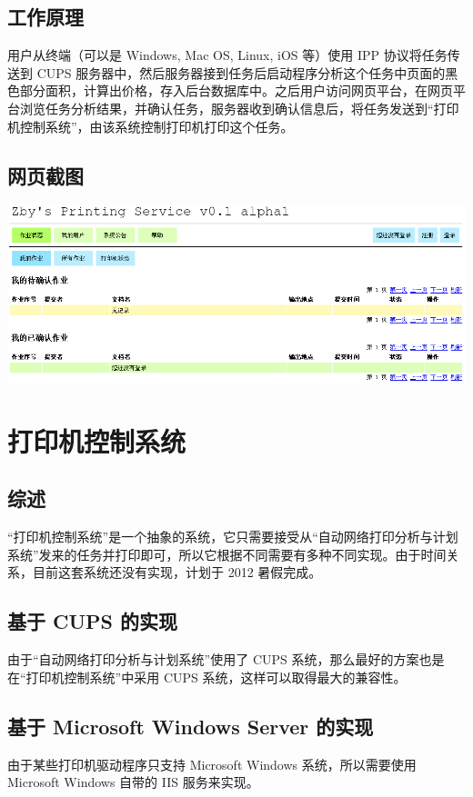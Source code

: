 \documentclass{article}
\begin{document}
\begin{CJK}{UTF8}{gbsn}
	\subsection{工作原理}
		用户从终端（可以是 Windows, Mac OS, Linux, iOS 等）使用 IPP 协议将任务传送到 CUPS 服务器中，然后服务器接到任务后启动程序分析这个任务中页面的黑色部分面积，计算出价格，存入后台数据库中。之后用户访问网页平台，在网页平台浏览任务分析结果，并确认任务，服务器收到确认信息后，将任务发送到“打印机控制系统”，由该系统控制打印机打印这个任务。

	\subsection{网页截图}
		\includegraphics[width=\textwidth]{screenshot.png}
\newpage

\section{打印机控制系统}
	\subsection{综述}
		“打印机控制系统”是一个抽象的系统，它只需要接受从“自动网络打印分析与计划系统”发来的任务并打印即可，所以它根据不同需要有多种不同实现。由于时间关系，目前这套系统还没有实现，计划于 2012 暑假完成。
	\subsection{基于 CUPS 的实现}
		由于“自动网络打印分析与计划系统”使用了 CUPS 系统，那么最好的方案也是在“打印机控制系统”中采用 CUPS 系统，这样可以取得最大的兼容性。
	\subsection{基于 Microsoft Windows Server 的实现}
		由于某些打印机驱动程序只支持 Microsoft Windows 系统，所以需要使用 Microsoft Windows 自带的 IIS 服务来实现。
\newpage


\end{CJK}
\end{document}
